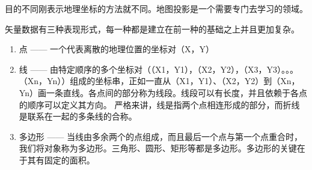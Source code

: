 目的不同刚表示地理坐标的方法就不同。地图投影是一个需要专门去学习的领域。

矢量数据有三种表现形式，每一种都是建立在前一种的基础之上并且更加复杂。

\begin{enumerate}
\item 点 —— 一个代表离散的地理位置的坐标对（X，Y）
\item 线 —— 由特定顺序的多个坐标对（（X1，Y1），（X2，Y2），（X3，Y3）。。。（Xn，Yn））组成的坐标串，正如一直从（X1，Y1）、（X2，Y2）到（Xn，Yn）画一条直线。各点间的部分称为线段。线段可以有长度，并且依赖于各点的顺序可以定义其方向。 严格来讲，线是指两个点相连形成的部分，而折线是联系在一起的多条线的合称。  
\item 多边形 —— 当线由多余两个的点组成，而且最后一个点与第一个点重合时，我们将对象称为多边形。三角形、圆形、矩形等都是多边形。多边形的关键在于其有固定的面积。
\end{enumerate}

